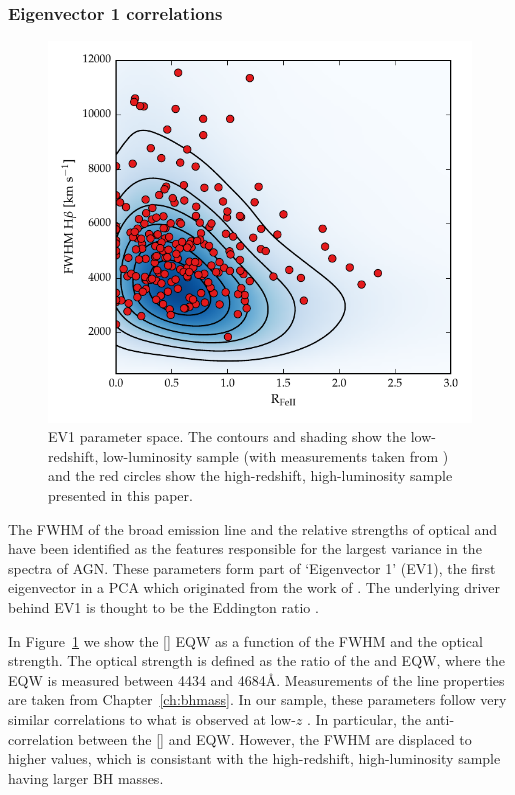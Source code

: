 \subsubsection{Eigenvector 1 correlations}

\begin{figure}
    \includegraphics[width=\columnwidth]{figures/chapter04/ev1_lowz.pdf} 
    \caption{\ac{EV1} parameter space. The contours and shading show the low-redshift, low-luminosity sample (with measurements taken from \citet{shen11}) and the red circles show the high-redshift, high-luminosity sample presented in this paper.}      
    \label{fig:ev1_lowz}
\end{figure}

The FWHM of the broad \hb emission line and the relative strengths of optical  and \hb have been identified as the features responsible for the largest variance in the spectra of AGN. 
These parameters form part of `Eigenvector 1' (EV1), the first eigenvector in a \ac{PCA} which originated from the work of \citet{boroson92}.   
The underlying driver behind EV1 is thought to be the Eddington ratio \citep[e.g.][]{sulentic00b,shen14}. 

In Figure~\ref{fig:ev1_lowz} we show the [] \ac{EQW} as a function of the \hb FWHM and the optical  strength. 
The optical  strength is defined as the ratio of the  and \hb \ac{EQW}, where the  \ac{EQW} is measured between 4434 and 4684\AA.
Measurements of the \hb line properties are taken from Chapter~\ref{ch:bhmass}. 
In our sample, these parameters follow very similar correlations to what is observed at low-$z$ \citep[see also][]{sulentic04, shen16a}.
In particular, the anti-correlation between the [] and  \ac{EQW}.  
However, the \hb FWHM are displaced to higher values, which is consistant with the high-redshift, high-luminosity sample having larger \ac{BH} masses. 

